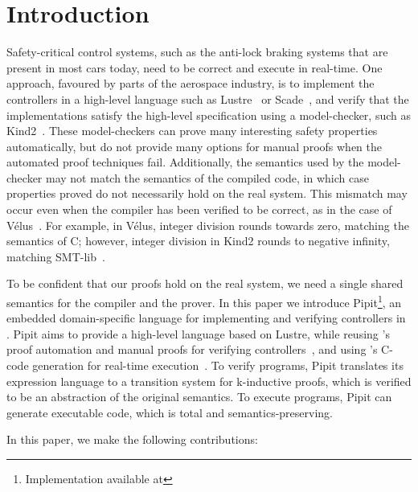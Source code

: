 \section{Introduction}
Safety-critical control systems, such as the anti-lock braking systems that are present in most cars today, need to be correct and execute in real-time.
One approach, favoured by parts of the aerospace industry, is to implement the controllers in a high-level language such as Lustre~\cite{caspi1995functional} or Scade~\cite{colaco2017scade}, and verify that the implementations satisfy the high-level specification using a model-checker, such as Kind2~\cite{champion2016kind2}.
These model-checkers can prove many interesting safety properties automatically, but do not provide many options for manual proofs when the automated proof techniques fail.
Additionally, the semantics used by the model-checker may not match the semantics of the compiled code, in which case properties proved do not necessarily hold on the real system.
This mismatch may occur even when the compiler has been verified to be correct, as in the case of Vélus~\cite{bourke2017formally}.
For example, in Vélus, integer division rounds towards zero, matching the semantics of C; however, integer division in Kind2 rounds to negative infinity, matching SMT-lib~\cite{BarFT2016SMTLIB,kind2023intdiv}.

To be confident that our proofs hold on the real system, we need a single shared semantics for the compiler and the prover.
In this paper we introduce Pipit\footnote{Implementation available at \GITHUBURL}, an embedded domain-specific language for implementing and verifying controllers in \fstar{}.
Pipit aims to provide a high-level language based on Lustre, while reusing \fstar{}'s proof automation and manual proofs for verifying controllers~\cite{martinez2019meta}, and using \lowstar{}'s C-code generation for real-time execution~\cite{protzenko2017verified}.
To verify programs, Pipit translates its expression language to a transition system for k-inductive proofs, which is verified to be an abstraction of the original semantics.
To execute programs, Pipit can generate executable code, which is total and semantics-preserving.



In this paper, we make the following contributions:

